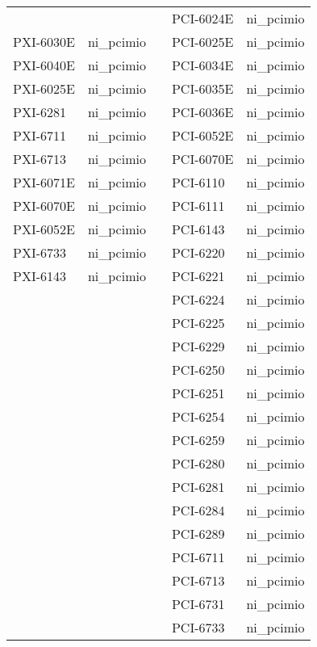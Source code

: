 \begin{fullpage}
\begin{table}
\begin{center}
\begin{tabular}{lcclc}
& & & PCI-6024E & ni\_pcimio\\ 
PXI-6030E & ni\_pcimio &  & PCI-6025E & ni\_pcimio\\ 
PXI-6040E & ni\_pcimio &  & PCI-6034E & ni\_pcimio\\ 
PXI-6025E & ni\_pcimio &  & PCI-6035E & ni\_pcimio\\ 
PXI-6281 & ni\_pcimio &  & PCI-6036E & ni\_pcimio\\ 
PXI-6711 & ni\_pcimio &  & PCI-6052E & ni\_pcimio\\ 
PXI-6713 & ni\_pcimio &  & PCI-6070E & ni\_pcimio\\ 
PXI-6071E & ni\_pcimio &  & PCI-6110 & ni\_pcimio\\ 
PXI-6070E & ni\_pcimio &  & PCI-6111 & ni\_pcimio\\ 
PXI-6052E & ni\_pcimio &  & PCI-6143 & ni\_pcimio\\ 
PXI-6733 & ni\_pcimio &  & PCI-6220 & ni\_pcimio\\ 
PXI-6143 & ni\_pcimio &  & PCI-6221 & ni\_pcimio\\ 
& & & PCI-6224 & ni\_pcimio\\ 
& & & PCI-6225 & ni\_pcimio\\ 
& & & PCI-6229 & ni\_pcimio\\ 
& & & PCI-6250 & ni\_pcimio\\ 
& & & PCI-6251 & ni\_pcimio\\ 
& & & PCI-6254 & ni\_pcimio\\ 
& & & PCI-6259 & ni\_pcimio\\ 
& & & PCI-6280 & ni\_pcimio\\ 
& & & PCI-6281 & ni\_pcimio\\ 
& & & PCI-6284 & ni\_pcimio\\ 
& & & PCI-6289 & ni\_pcimio\\ 
& & & PCI-6711 & ni\_pcimio\\ 
& & & PCI-6713 & ni\_pcimio\\ 
& & & PCI-6731 & ni\_pcimio\\ 
& & & PCI-6733 & ni\_pcimio\\ 
\end{tabular}
\end{center}
\end{table}
\end{fullpage}

